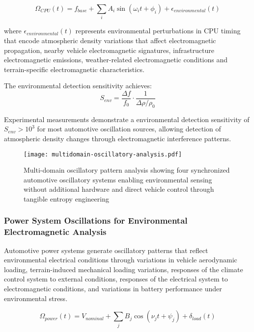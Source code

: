 \documentclass[12pt,a4paper]{article}
\begin{document}
\begin{equation}
\Omega_{CPU}(t) = f_{base} + \sum_{i} A_i \sin(\omega_i t + \phi_i) + \epsilon_{environmental}(t)
\end{equation}

where $\epsilon_{environmental}(t)$ represents environmental perturbations in CPU timing that encode atmospheric density variations that affect electromagnetic propagation, nearby vehicle electromagnetic signatures, infrastructure electromagnetic emissions, weather-related electromagnetic conditions and terrain-specific electromagnetic characteristics.

The environmental detection sensitivity achieves:
\begin{equation}
S_{env} = \frac{\Delta f}{f_0} \cdot \frac{1}{\Delta \rho / \rho_0}
\end{equation}

Experimental measurements demonstrate a environmental detection sensitivity of $S_{env} > 10^3$ for most automotive oscillation sources, allowing detection of atmospheric density changes through electromagnetic interference patterns.

\begin{figure}[H]
\centering
\texttt{[image: multidomain-oscillatory-analysis.pdf]}
\caption{Multi-domain oscillatory pattern analysis showing four synchronized automotive oscillatory systems enabling environmental sensing without additional hardware and direct vehicle control through tangible entropy engineering}
\label{fig:multidomain-oscillatory-analysis}
\end{figure}


\subsubsection{Power System Oscillations for Environmental Electromagnetic Analysis}

Automotive power systems generate oscillatory patterns that reflect environmental electrical conditions through variations in vehicle aerodynamic loading, terrain-induced mechanical loading variations, responses of the climate control system to external conditions, responses of the electrical system to electromagnetic conditions, and variations in battery performance under environmental stress.

\begin{equation}
\Omega_{power}(t) = V_{nominal} + \sum_{j} B_j \cos(\nu_j t + \psi_j) + \delta_{load}(t)
\end{equation}
\end{document}

